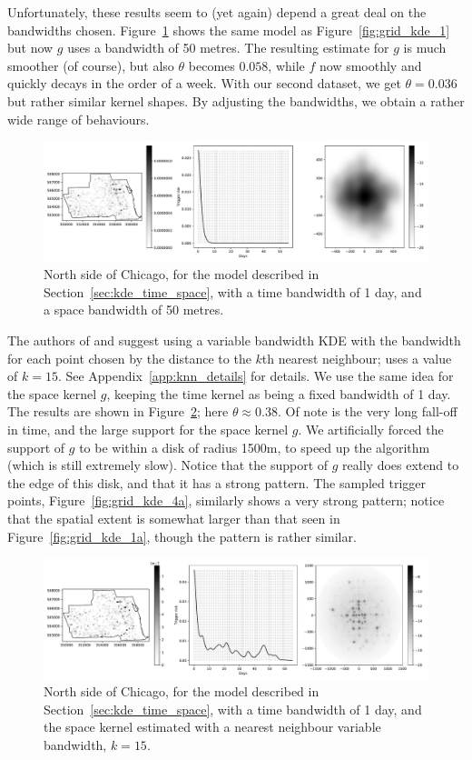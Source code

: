 \documentclass[twoside,a4paper]{article}
\theoremstyle{plain}
\theoremstyle{definition}
\begin{document}
Unfortunately, these results seem to (yet again) depend a great deal on the bandwidths chosen.
Figure~\ref{fig:grid_kde_3} shows the same model as Figure~\ref{fig:grid_kde_1} but now $g$ uses
a bandwidth of 50 metres.  The resulting estimate for $g$ is much smoother (of course), but also
$\theta$ becomes $0.058$, while $f$ now smoothly and quickly decays in the order of a week.
With our second dataset, we get $\theta=0.036$ but rather similar kernel shapes.  By adjusting
the bandwidths, we obtain a rather wide range of behaviours.

\begin{figure}
  \includegraphics[width=\textwidth]{../notebooks/grid_kde_three.pdf}
  \caption{North side of Chicago, for the model described in Section~\ref{sec:kde_time_space},
  with a time bandwidth of 1 day, and a space bandwidth of 50 metres.}
  \label{fig:grid_kde_3}
\end{figure}

The authors of \cite{sepp} and \cite{zovj} suggest using a variable bandwidth KDE with the
bandwidth for each point chosen by the distance to the $k$th nearest neighbour; \cite{sepp}
uses a value of $k=15$.  See Appendix~\ref{app:knn_details} for details.
We use the same idea for the space kernel $g$, keeping the time
kernel as being a fixed bandwidth of 1 day.  The results are shown in Figure~\ref{fig:grid_kde_4};
here $\theta \approx 0.38$.  Of note is the very long fall-off in time, and the large support for
the space kernel $g$.  We artificially forced the support of $g$ to be within a disk of radius
1500m, to speed up the algorithm (which is still extremely slow).  Notice that the support of
$g$ really does extend to the edge of this disk, and that it has a strong pattern.  The sampled
trigger points, Figure~\ref{fig:grid_kde_4a}, similarly shows a very strong pattern; notice
that the spatial extent is somewhat larger than that seen in Figure~\ref{fig:grid_kde_1a},
though the pattern is rather similar.

\begin{figure}
  \includegraphics[width=\textwidth]{../notebooks/grid_kde_knn1.pdf}
  \caption{North side of Chicago, for the model described in Section~\ref{sec:kde_time_space},
  with a time bandwidth of 1 day, and the space kernel estimated with a nearest neighbour variable
  bandwidth, $k=15$.}
  \label{fig:grid_kde_4}
\end{figure}
\end{document}
